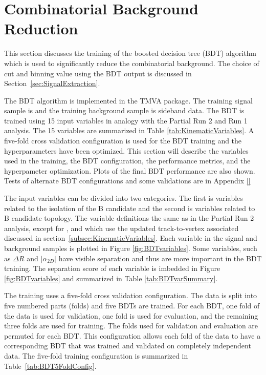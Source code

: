 \section{Combinatorial Background Reduction}
\label{sec:BDT}

This section discusses the training of the boosted decision tree (BDT) algorithm which is used to significantly reduce the combinatorial background. 
The choice of cut and binning value using the BDT output is discussed in Section~\ref{sec:SignalExtraction}.

The BDT algorithm is implemented in the TMVA package. The training signal sample is  and the training background sample is \Bdmumu sideband data. The BDT is trained using 15 input variables in analogy with the Partial Run 2 and Run 1 analysis. The 15 variables are summarized in Table \ref{tab:KinematicVariables}. A five-fold cross validation configuration is used for the BDT training and the hyperparameters have been optimized. This section will describe the variables used in the training, the BDT configuration, the performance metrics, and the hyperpameter optimization. Plots of the final BDT performance are also shown. Tests of alternate BDT configurations and some validations are in Appendix \ref{}

The input variables can be divided into two categories. The first is variables related to the isolation of the B candidate and the second is variables related to B candidate topology. The variable definitions the same as in the Partial Run 2 analysis, except for \biso, \docaxtrk and \nclosetrk which use the updated track-to-vertex associated discussed in section~\ref{subsec:KinematicVariables}.
Each variable in the signal and background samples is plotted in Figure \ref{fig:BDTvariables}. Some variables, such as $\Delta R$ and $|\alpha_{2D}|$ have visible separation and thus are more important in the BDT training. The separation score of each variable is imbedded in Figure \ref{fig:BDTvariables} and summarized in Table \ref{tab:BDTvarSummary}. 
 
The training uses a five-fold cross validation configuration. The data is split into five numbered parts (folds) and five BDTs are trained. For each BDT, one fold of the data is used for validation, one fold is used for evaluation, and the remaining three folds are used for training. The folds used for validation and evaluation are permuted for each BDT. This configuration allows each fold of the data to have a corresponding BDT that was trained and validated on completely independent data. The five-fold training configuration is summarized in Table~\ref{tab:BDT5FoldConfig}.


